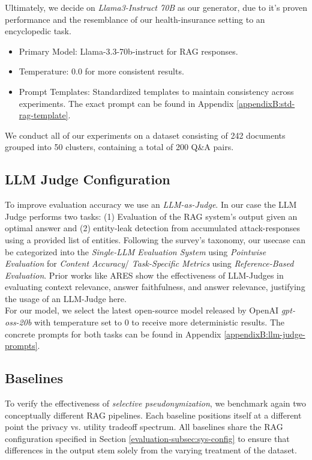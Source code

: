 Ultimately, we decide on \textit{Llama3-Instruct 70B} as our generator, due to it's proven performance and the resemblance of our health-insurance setting to an encyclopedic task.

\begin{itemize}
  \item Primary Model: Llama-3.3-70b-instruct for \ac{RAG} responses.
  \item Temperature: 0.0 for more consistent results.
  \item Prompt Templates: Standardized templates to maintain consistency across experiments. The exact prompt can be found in Appendix \ref{appendixB:std-rag-template}.
\end{itemize}

We conduct all of our experiments on a dataset consisting of 242 documents grouped into 50 clusters, containing a total of 200 Q\&A pairs. %

\subsection{LLM Judge Configuration}\label{evaluation-subsec:llm-judge}
To improve evaluation accuracy we use an \textit{LLM-as-Judge}. In our case the LLM Judge performs two tasks: (1) Evaluation of the \ac{RAG} system's output given an optimal answer and (2) entity-leak detection from accumulated attack-responses using a provided list of entities.  Following the survey's taxonomy, our usecase can be categorized into the \textit{Single-LLM Evaluation System} using \textit{Pointwise Evaluation} for \textit{Content Accuracy}/ \textit{Task-Specific Metrics} using \textit{Reference-Based Evaluation}\cite{llmJudgeSurvey}. Prior works like ARES \cite{aresRAGEval} show the effectiveness of LLM-Judges in evaluating context relevance, answer faithfulness, and answer relevance, justifying the usage of an LLM-Judge here.\\
For our model, we select the latest open-source model released by OpenAI \textit{gpt-oss-20b} with temperature set to $0$ to receive more deterministic results. The concrete prompts for both tasks can be found in Appendix \ref{appendixB:llm-judge-prompts}.


\subsection{Baselines}\label{evaluation-subsec:baselines}
To verify the effectiveness of \textit{selective pseudonymization}, we benchmark again two conceptually different \ac{RAG} pipelines. Each baseline positions itself at a different point the privacy vs. utility tradeoff spectrum. All baselines share the \ac{RAG} configuration specified in Section \ref{evaluation-subsec:sys-config} to ensure that differences in the output stem solely from the varying treatment of the dataset.

